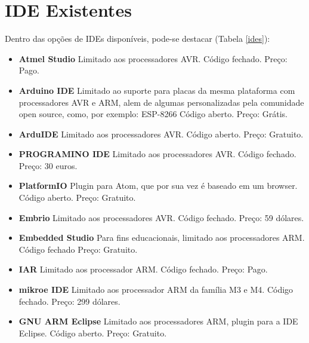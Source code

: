 \section{IDE Existentes}
Dentro das opções de IDEs disponíveis, pode-se destacar (Tabela \ref{ides}):
\iffalse
\begin{itemize}
 \item \textbf{Atmel Studio}
 \subitem Limitado aos processadores AVR.
 \subitem Código fechado.
 \subitem Preço: Pago.

 \item \textbf{Arduino IDE}
 \subitem Limitado ao suporte para placas da mesma plataforma com processadores AVR e ARM, alem de algumas personalizadas
 pela comunidade open source, como, por exemplo: ESP-8266
 \subitem Código aberto.
 \subitem Preço: Grátis.

 \item \textbf{ArduIDE}
 \subitem Limitado aos processadores AVR.
 \subitem Código aberto.
 \subitem Preço: Gratuito.

 \item \textbf{PROGRAMINO IDE}
 \subitem Limitado aos processadores AVR.
 \subitem Código fechado.
 \subitem Preço: 30 euros.

 \item \textbf{PlatformIO}
 \subitem Plugin para Atom, que por sua vez é baseado em um browser.
 \subitem Código aberto.
 \subitem Preço: Gratuito.

 \item \textbf{Embrio}
 \subitem Limitado aos processadores AVR.
 \subitem Código fechado.
 \subitem Preço: 59 dólares.

 \item \textbf{Embedded Studio}
 \subitem Para fins educacionais, limitado aos processadores ARM.
 \subitem Código fechado
 \subitem Preço: Gratuito.

 \item \textbf{IAR}
 \subitem Limitado aos processador ARM.
 \subitem Código fechado.
 \subitem Preço: Pago.

 \item \textbf{mikroe IDE}
 \subitem Limitado aos processador ARM da família M3 e M4.
 \subitem Código fechado.
 \subitem Preço: 299 dólares.

 \item \textbf{GNU ARM Eclipse}
 \subitem Limitado aos processadores ARM, plugin para a IDE Eclipse.
 \subitem Código aberto.
 \subitem Preço: Gratuito.


\end{itemize}
